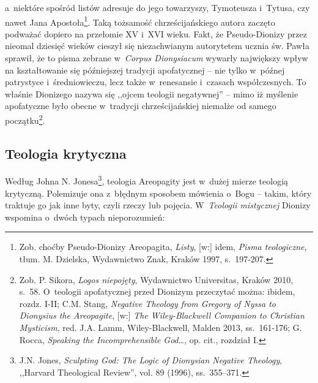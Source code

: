a~niektóre spośród listów adresuje do jego towarzyszy, Tymoteusza i~Tytusa, czy nawet Jana Apostoła\footnote{Zob. choćby Pseudo-Dionizy Areopagita, \textit{Listy}, [w:] idem, \textit{Pisma teologiczne}, tłum. M. Dzielska, Wydawnictwo Znak, Kraków 1997, s.~197-207.}. Taką tożsamość chrześcijańskiego autora zaczęto podważać dopiero na przełomie XV i~XVI wieku. Fakt, że Pseudo-Dionizy przez nieomal dziesięć wieków cieszył się niezachwianym autorytetem ucznia św. Pawła sprawił, że to pisma zebrane w~\textit{Corpus Dionysiacum} wywarły największy wpływ na kształtowanie się późniejszej tradycji apofatycznej -- nie tylko w~późnej patrystyce i~średniowieczu, lecz także w~renesansie i~czasach współczesnych. To właśnie Dionizego nazywa się ,,ojcem teologii negatywnej'' -- mimo iż myślenie apofatyczne było obecne w~tradycji chrześcijańskiej niemalże od samego początku\footnote{Zob. P. Sikora, \textit{Logos niepojęty}, Wydawnictwo Universitas, Kraków 2010, s.~58. O~teologii apofatycznej przed Dionizym przeczytać można: ibidem, rozdz. I-II; C.M. Stang, \textit{Negative Theology from Gregory of Nyssa to Dionysius the Areopagite}, [w:] \textit{The Wiley-Blackwell Companion to Christian Mysticism}, red. J.A. Lamm, Wiley-Blackwell, Malden 2013, ss.~161-176; G. Rocca, \textit{Speaking the Incomprehensible God}\ldots, op. cit., rozdział I.}.


\subsection*{Teologia krytyczna}

Według Johna N. Jonesa\footnote{J.N. Jones, \textit{Sculpting God: The Logic of Dionysian Negative Theology}, ,,Harvard Theological Review'', vol. 89 (1996), ss.~355–371.}, teologia Areopagity jest w~dużej mierze teologią krytyczną. Polemizuje ona z~błędnym sposobem mówienia o~Bogu -- takim, który traktuje go jak inne byty, czyli rzeczy lub pojęcia. W~\textit{Teologii mistycznej} Dionizy wspomina o~dwóch typach nieporozumień:

